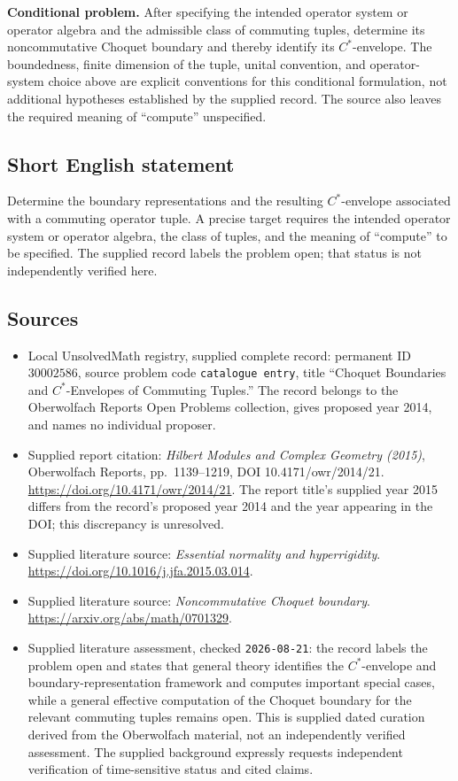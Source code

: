 \documentclass[11pt]{article}
\begin{document}
\textbf{Conditional problem.} After specifying the intended operator system or operator algebra and the admissible class of commuting tuples, determine its noncommutative Choquet boundary and thereby identify its \(C^*\)-envelope. The boundedness, finite dimension of the tuple, unital convention, and operator-system choice above are explicit conventions for this conditional formulation, not additional hypotheses established by the supplied record. The source also leaves the required meaning of ``compute'' unspecified.
\subsection{Short English statement}
Determine the boundary representations and the resulting \(C^*\)-envelope associated with a commuting operator tuple. A precise target requires the intended operator system or operator algebra, the class of tuples, and the meaning of ``compute'' to be specified. The supplied record labels the problem open; that status is not independently verified here.
\subsection{Sources}
\begin{itemize}
\item Local UnsolvedMath registry, supplied complete record: permanent ID \(30002586\), source problem code \texttt{catalogue entry}, title ``Choquet Boundaries and \(C^*\)-Envelopes of Commuting Tuples.'' The record belongs to the Oberwolfach Reports Open Problems collection, gives proposed year 2014, and names no individual proposer.
\item Supplied report citation: \emph{Hilbert Modules and Complex Geometry (2015)}, Oberwolfach Reports, pp.\ 1139--1219, DOI 10.4171/owr/2014/21. \url{https://doi.org/10.4171/owr/2014/21}. The report title's supplied year 2015 differs from the record's proposed year 2014 and the year appearing in the DOI; this discrepancy is unresolved.
\item Supplied literature source: \emph{Essential normality and hyperrigidity}. \url{https://doi.org/10.1016/j.jfa.2015.03.014}.
\item Supplied literature source: \emph{Noncommutative Choquet boundary}. \url{https://arxiv.org/abs/math/0701329}.
\item Supplied literature assessment, checked \texttt{2026-08-21}: the record labels the problem open and states that general theory identifies the \(C^*\)-envelope and boundary-representation framework and computes important special cases, while a general effective computation of the Choquet boundary for the relevant commuting tuples remains open. This is supplied dated curation derived from the Oberwolfach material, not an independently verified assessment. The supplied background expressly requests independent verification of time-sensitive status and cited claims.
\end{itemize}
\end{document}
